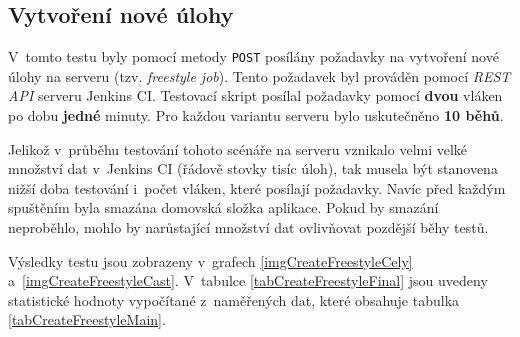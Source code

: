         \subsection{Vytvoření nové úlohy}
            V~tomto testu byly pomocí metody \texttt{POST} posílány požadavky na vytvoření
            nové úlohy na serveru (tzv. \emph{freestyle job}). Tento požadavek
            byl prováděn pomocí \emph{REST API} serveru Jenkins CI.
            Testovací skript posílal požadavky pomocí \textbf{dvou} vláken po dobu \textbf{jedné} minuty.
            Pro každou variantu serveru bylo uskutečněno \textbf{10 běhů}.

            Jelikož v~průběhu testování tohoto scénáře na serveru vznikalo velmi velké množství dat v~Jenkins CI (řádově stovky tisíc úloh),
            tak musela být stanovena nižší doba testování i~počet vláken, které posílají požadavky.
            Navíc před každým spuštěním byla smazána domovská složka aplikace. Pokud by smazání neproběhlo,
            mohlo by narůstající množství dat ovlivňovat pozdější běhy testů.

            Výsledky testu jsou zobrazeny v~grafech \ref{imgCreateFreestyleCely} a~\ref{imgCreateFreestyleCast}.
            V~tabulce \ref{tabCreateFreestyleFinal} jsou uvedeny statistické hodnoty vypočítané
            z~naměřených dat, které obsahuje tabulka \ref{tabCreateFreestyleMain}.

